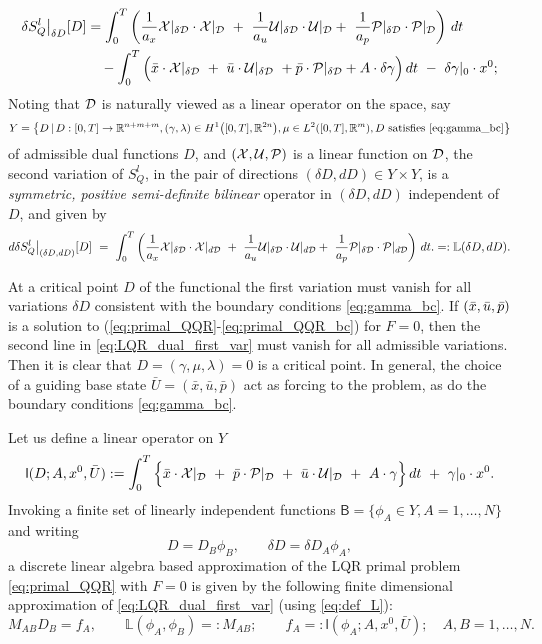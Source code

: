 \documentclass[11pt]{article}
\begin{document}
\begin{equation}
    \label{eq:LQR_dual_first_var}
    \begin{aligned}
        \delta S^l_Q\big|_{\delta D} [D] & = \int_0^T  \left( \frac{1}{a_x}  \calX|_{\delta \dee} \cdot \calX|_\dee \ + \ \frac{1}{a_u} \calU|_{\delta \dee} \cdot \calU|_\dee
    + \ \frac{1}{a_p} \calP|_{\delta \dee} \cdot \calP|_\dee \right) \, dt \\
    &  \quad - \int_0^T \Big( \bar{x} \cdot \calX|_{\delta \dee} \ + \ \bar{u} \cdot \calU|_{\delta \dee} \ + \bar{p} \cdot \calP|_{\delta \dee} + A \cdot \delta \gamma \Big) \, dt \  - \ \delta \gamma|_0 \cdot x^0;
    \end{aligned}
\end{equation}
 Noting that $\mathcal{D}$ is naturally viewed as a linear operator on the space, say 
 \[
 Y = \big\{ D \, | \, D:[0,T] \to \mathbb R^{n+m+m}, (\gamma, \lambda) \in H^1 \big([0,T],\mathbb R^{2n}\big), \mu \in L^{2}([0,T],\mathbb R^m) , D \mbox{ satisfies } \eqref{eq:gamma_bc} \big\}
 \]
 of admissible dual functions $D$,  and $({\cal X}, {\cal U}, {\cal P})$ is a linear function on $\mathcal{D}$, the second variation of $S^l_Q$, in the pair of directions $(\delta D, d D) \in Y \times Y$, is a \emph{symmetric, positive semi-definite bilinear} operator in $(\delta D, d D)$ independent of $D$,  and given by
 \begin{equation}\label{eq:def_L}
     d \delta S^l_Q\big|_{(\delta D, dD)} [D] \ = \ \int_0^T  \left( \frac{1}{a_x}  \calX|_{\delta \dee} \cdot \calX|_{d \dee} \ + \ \frac{1}{a_u} \calU|_{\delta \dee} \cdot \calU|_{d \dee}
    + \ \frac{1}{a_p} \calP|_{\delta \dee} \cdot \calP|_{d \dee} \right) \, dt. =: \mathbb{L} (\delta D, d D).
 \end{equation}
 
At a critical point $D$ of the functional the first variation must vanish for all variations $\delta D$ consistent with the boundary conditions \eqref{eq:gamma_bc}. If $(\bar{x},\Bar{u},\bar{p})$ is a solution to (\ref{eq:primal_QQR}-\ref{eq:primal_QQR_bc}) for $F = 0$, then the second line in \eqref{eq:LQR_dual_first_var} must vanish for all admissible variations. Then it is clear that $D = (\gamma, \mu, \lambda) = 0$ is a critical point. In general, the choice of a guiding base state $\bar{U} = (\bar{x}, \bar{u}, \bar{p})$ act as forcing to the problem, as do the boundary conditions \eqref{eq:gamma_bc}.

Let us define a linear operator on $Y$
\[
\mathsf{l}(D;A,x^0,\bar{U}) := \int_0^T \Big\{ \bar{x} \cdot {\cal X} |_{\mathcal{D}}  \ + \ \bar{p} \cdot {\cal P} |_{\mathcal{D}}  \ + \ \bar{u} \cdot {\cal U} |_{\mathcal{D}} \ + \ A \cdot \gamma \Big\} \, dt \ + \  \gamma|_0 \cdot x^0.
\]
Invoking a finite set of linearly independent functions $\mathsf{B} = \{ \phi_A \in Y, A = 1, \ldots, N \}$ and writing 
\[
D = D_B \phi_B, \qquad \delta D = \delta D_A \phi_A,
\]
a discrete linear algebra based approximation of the  LQR primal problem \eqref{eq:primal_QQR} with $F = 0$ is given by the following finite dimensional approximation of \eqref{eq:LQR_dual_first_var} (using \eqref{eq:def_L}):
\[
M_{AB} D_B = f_A, \qquad \mathbb{L}(\phi_A, \phi_B) =: M_{AB}; \qquad f_A =: \mathsf{l}(\phi_A; A,x^0, \bar{U}); \quad A, B = 1, \ldots, N.
\]
\end{document}
